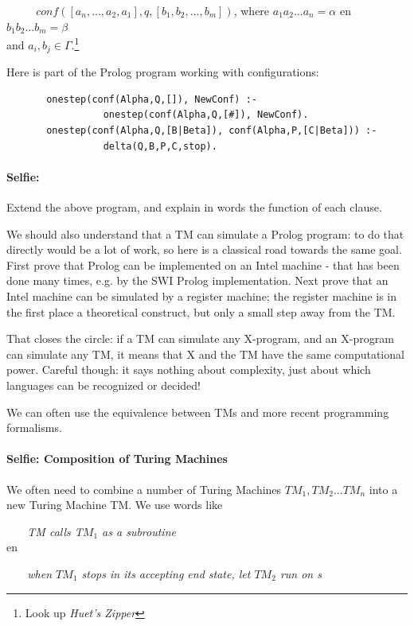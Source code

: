 $~~~~~~~~~~~~conf([a_n, ... , a_2,a_1],q,[b_1,b_2,...,b_m])$, where
$a_1a_2...a_n = \alpha$ en $b_1b_2...b_m = \beta$
%
\\ and $a_i, b_j \in \Gamma$.\footnote{Look up {\em Huet's Zipper}}

Here is part of the Prolog program working with configurations:

\begin{verbatim}
       onestep(conf(Alpha,Q,[]), NewConf) :-
                 onestep(conf(Alpha,Q,[#]), NewConf).
       onestep(conf(Alpha,Q,[B|Beta]), conf(Alpha,P,[C|Beta])) :-
                 delta(Q,B,P,C,stop).
\end{verbatim}

\paragraph{Selfie:} Extend the above program, and explain in words the function of each clause.


We should also understand that a TM can simulate a Prolog program: to
do that directly would be a lot of work, so here is a classical road
towards the same goal. First prove that Prolog can be implemented on
an Intel machine - that has been done many times, e.g. by the SWI
Prolog implementation. Next prove that an Intel machine can be
simulated by a register machine; the register machine is in the first
place a theoretical construct, but only a small step away from the TM.

That closes the circle: if a TM can simulate any X-program, and an
X-program can simulate any TM, it means that X and the TM have the
same computational power. Careful though: it says nothing about
complexity, just about which languages can be recognized or decided!

We can often use the equivalence between TMs and more recent
programming formalisms.



\paragraph{Selfie: Composition of Turing Machines}

We often need to combine a number of Turing Machines $TM_1, TM_2
... TM_n$ into a new Turing Machine TM. We use words like

$~~~~~~~$ {\em TM calls T$M_1$ as a subroutine}\\
en

$~~~~~~~$ {\em when $TM_1$ stops in its accepting end state,
let $TM_2$ run on s}


